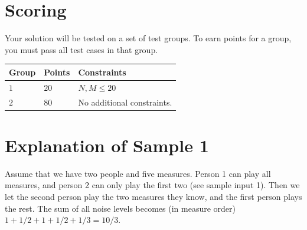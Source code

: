 \section*{Scoring}
Your solution will be tested on a set of test groups.
To earn points for a group, you must pass all test cases in that group.

\noindent
\begin{tabular}{| l | l | p{12cm} |}
  \hline
  \textbf{Group} & \textbf{Points} & \textbf{Constraints} \\ \hline
  $1$    & $20$       & $N, M \leq 20$ \\ \hline
  $2$    & $80$       & No additional constraints. \\ \hline
\end{tabular}



\section*{Explanation of Sample 1}
Assume that we have two people and five measures. Person 1 can play all measures, and person 2 can only play the first two (see sample input 1). Then we let the second person play the two measures they know, and the first person plays the rest. The sum of all noise levels becomes (in measure order) $1 + 1/2 + 1 + 1/2 + 1/3 = 10/3$.
